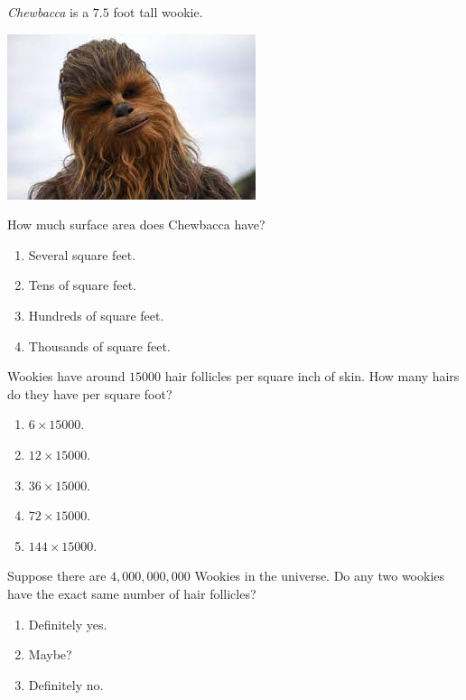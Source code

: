 \documentclass{ximera}
\begin{document}
\begin{exercise}
  \textit{Chewbacca} is a $7.5$ foot tall wookie.
  \begin{center}
    \includegraphics{chewbacca.jpeg}
  \end{center}
  How much surface area does Chewbacca have?
  \begin{enumerate}
  \item Several square feet.
  \item Tens of square feet.
  \item Hundreds of square feet.
  \item Thousands of square feet.
  \end{enumerate}
  \end{exercise}



\begin{exercise}
  Wookies have around $15000$ hair follicles per square inch of
  skin. How many hairs do they have per square foot?
  \begin{enumerate}
  \item $6\times 15000$.
  \item $12\times 15000$.
  \item $36\times 15000$.
  \item $72\times 15000$.
  \item $144\times 15000$.
  \end{enumerate}
\end{exercise}


\begin{exercise}
  Suppose there are $4,000,000,000$ Wookies in the universe. Do any
  two wookies have the exact same number of hair follicles?
  \begin{enumerate}
  \item Definitely yes. %
  \item Maybe?
  \item Definitely no.
  \end{enumerate}
  
\end{exercise}




\end{document}
